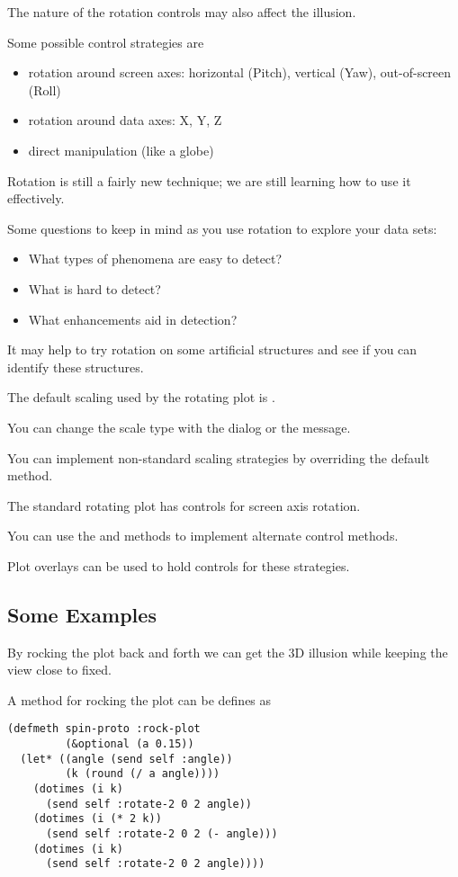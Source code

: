 \begin{slide}{}
The nature of the rotation controls may also affect the illusion.

Some possible control strategies are
\begin{itemize}
\item rotation around screen axes: horizontal (Pitch), vertical (Yaw), out-of-screen
(Roll)
\item rotation around data axes: X, Y, Z
\item direct manipulation (like a globe)
\end{itemize}

Rotation is still a fairly new technique; we are still learning
how to use it effectively.

Some questions to keep in mind as you use rotation to explore
your data sets:
\begin{itemize}
\item What types of phenomena are easy to detect?
\item What is hard to detect?
\item What enhancements aid in detection?
\end{itemize}
It may help to try rotation on some artificial structures and see if
you can identify these structures.
\end{slide}

\begin{slide}{}
The default scaling used by the rotating plot is .

You can change the scale type with the  dialog or
the  message.

You can implement non-standard scaling strategies by overriding the
default  method.

The standard rotating plot has controls for screen axis rotation.

You can use the  and 
methods to implement alternate control methods.

Plot overlays can be used to hold controls for these strategies.
\end{slide}

\begin{slide}{}
\subsection{Some Examples}
By rocking the plot back and forth we can get the 3D illusion
while keeping the view close to fixed.

A method for rocking the plot can be defines as
{\Large
\begin{verbatim}
(defmeth spin-proto :rock-plot
         (&optional (a 0.15))
  (let* ((angle (send self :angle))
         (k (round (/ a angle))))
    (dotimes (i k)
      (send self :rotate-2 0 2 angle))
    (dotimes (i (* 2 k))
      (send self :rotate-2 0 2 (- angle)))
    (dotimes (i k)
      (send self :rotate-2 0 2 angle))))
\end{verbatim}}
\end{slide}

